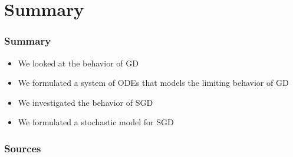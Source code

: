 \documentclass[17pt,institute=e10]{tuhh_presentation}
\begin{document}
\section{Summary}
\begin{frame}
  \frametitle{Summary}
  \begin{itemize}
    \item We looked at the behavior of GD
    \item We formulated a system of ODEs that models the limiting behavior of GD
    \item We investigated the behavior of SGD
    \item We formulated a stochastic model for SGD
  \end{itemize}
  \end{frame}
\begin{frame}
  \frametitle{Sources}
\printbibliography
\end{frame}
\end{document}
